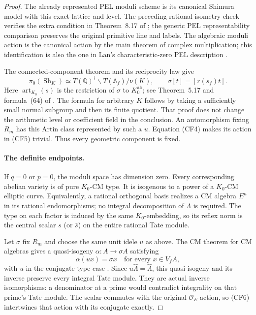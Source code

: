 \begin{proof}
The already represented PEL moduli scheme is its canonical Shimura
model with this exact lattice and level.  The preceding rational
isometry check verifies the extra condition in Theorem~8.17 of
\cite{component-field-shimura}; the generic PEL representability
comparison preserves the original primitive line and labels.
The algebraic moduli action is the canonical action by the main
theorem of complex multiplication; this identification is also the
one in Lan's characteristic-zero PEL description
\cite{component-field-pel}.

The connected-component theorem and its reciprocity law give
\[
 \pi_0(\operatorname{Sh}_K)\simeq
       T(\mathbb Q)^\dagger\backslash T(\mathbb A_f)/\nu(K),
 \qquad
 \sigma[t]=[r(s_f)t].                                  \tag{CF5}
\]
Here $\operatorname{art}_{K_0}(s)$ is the restriction of $\sigma$
to $K_0^{\mathrm{ab}}$; see Theorem~5.17 and formula~(64) of
\cite{component-field-shimura}.  The formula for arbitrary $K$
follows by taking a sufficiently small normal subgroup and then its
finite quotient.  That proof does not change the arithmetic level
or coefficient field in the conclusion.
An automorphism fixing $R_m$ has this Artin class represented by
such a $u$.  Equation (CF4) makes its action in (CF5) trivial.
Thus every geometric component is fixed.

\paragraph{The definite endpoints.}
If $q=0$ or $p=0$, the moduli space has dimension zero.
Every corresponding abelian variety is of pure $K_0$-CM type.
It is isogenous to a power of a $K_0$-CM elliptic curve.
Equivalently, a rational orthogonal basis realizes a CM algebra
$E^n$ in its rational endomorphisms; no integral decomposition of
$\Lambda$ is required.  The type on each factor is induced by the
same $K_0$-embedding, so its reflex norm is the central scalar $s$
(or $\bar s$) on the entire rational Tate module.

Let $\sigma$ fix $R_m$ and choose the same unit idele $u$ as above.
The CM theorem for CM algebras gives a quasi-isogeny
$\alpha:A\longrightarrow\sigma A$ satisfying
\[
                         \alpha(ux)=\sigma x
                  \quad\text{for every }x\in V_fA,
                                                        \tag{CF6}
\]
with $\bar u$ in the conjugate-type case
\cite[Theorem~9.10 and Remark~9.11]{component-field-cm}.
Since $u\widehat\Lambda=\widehat\Lambda$, this quasi-isogeny and
its inverse preserve every integral Tate module.  They are actual
inverse isomorphisms: a denominator at a prime would contradict
integrality on that prime's Tate module.  The scalar commutes with
the original $\mathcal O_E$-action, so (CF6) intertwines that action
with its conjugate exactly.


\end{proof}
